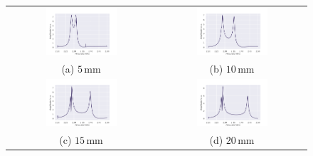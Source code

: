 \begin{figure}[H]
  \centering
  \begin{tabular}{cc}
    \includegraphics[width=0.5\textwidth]{Daten/Wasserstoffmolekuelion/H2_5mm.pdf} &   \includegraphics[width=0.5\textwidth]{Daten/Wasserstoffmolekuelion/H2_10mm.pdf} \\
  (a) $5 \, \si{\milli\metre}$  & (b) $10 \, \si{\milli\metre}$ \\[6pt]
  \includegraphics[width=0.5\textwidth]{Daten/Wasserstoffmolekuelion/H2_15mm.pdf} &   \includegraphics[width=0.5\textwidth]{Daten/Wasserstoffmolekuelion/H2_20mm_180.pdf} \\
  (c)  $15 \, \si{\milli\metre}$ & (d)  $20 \, \si{\milli\metre}$ \\[6pt]

\end{tabular}
\end{figure}
